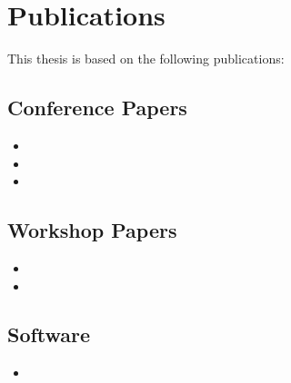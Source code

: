 \section*{Publications}

This thesis is based on the following publications:

\subsection*{Conference Papers}

\begin{itemize}
    \item {}
    \item {}
    \item {}
\end{itemize}

\subsection*{Workshop Papers}

\begin{itemize}
    \item {}
    \item {}
\end{itemize}

\subsection*{Software}

\begin{itemize}
    \item {}
\end{itemize}

\newpage
